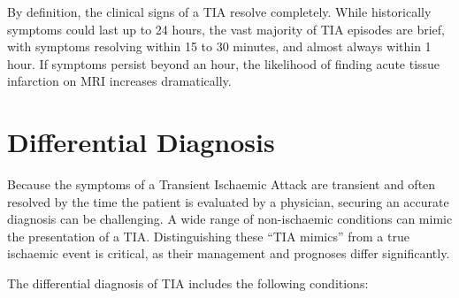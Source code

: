 By definition, the clinical signs of a TIA resolve completely. While historically symptoms could last up to 24 hours, the vast majority of TIA episodes are brief, with symptoms resolving within 15 to 30 minutes, and almost always within 1 hour. If symptoms persist beyond an hour, the likelihood of finding acute tissue infarction on MRI increases dramatically.

\section*{Differential Diagnosis}
Because the symptoms of a Transient Ischaemic Attack are transient and often resolved by the time the patient is evaluated by a physician, securing an accurate diagnosis can be challenging. A wide range of non-ischaemic conditions can mimic the presentation of a TIA. Distinguishing these ``TIA mimics'' from a true ischaemic event is critical, as their management and prognoses differ significantly.

The differential diagnosis of TIA includes the following conditions:

